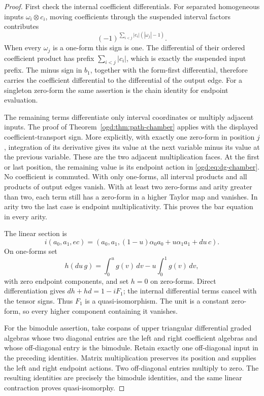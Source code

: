 \begin{proof}
First check the internal coefficient differentials. For separated
homogeneous inputs \(\omega_i\otimes c_i\), moving coefficients
through the suspended interval factors contributes
\[
 (-1)^{\sum_{i<j}|c_i|(|\omega_j|-1)}.
\]
When every \(\omega_j\) is a one-form this sign is one.
The differential of their ordered coefficient product has prefix
\(\sum_{i<j}|c_i|\), which is exactly the suspended input prefix.
The minus sign in \(b_1\), together with the form-first differential,
therefore carries the coefficient differential to the differential of
the output edge. For a singleton zero-form the same assertion is the
chain identity for endpoint evaluation.

The remaining terms differentiate only interval coordinates or multiply
adjacent inputs. The proof of Theorem~\ref{ogd:thm:path-chamber}
applies with the displayed coefficient-transport sign. More explicitly,
with exactly one zero-form in position \(j\), integration of its
derivative gives its value at the next variable minus its value at the
previous variable. These are the two adjacent multiplication faces.
At the first or last position, the remaining value is its endpoint
action in \eqref{ogd:eq:dg-chamber}. No coefficient is commuted.
With only one-forms, all interval products and all products of output
edges vanish. With at least two zero-forms and arity greater than two,
each term still has a zero-form in a higher Taylor map and vanishes.
In arity two the last case is endpoint multiplicativity. This proves
the bar equation in every arity.

The linear section is
\[
 i(a_0,a_1,ec)=
 (a_0,a_1,(1-u)\alpha_0a_0+u\alpha_1a_1+du\,c).
\]
On one-forms set
\[
 h(du\,g)=\int_0^u g(v)\,dv-u\int_0^1g(v)\,dv,
\]
with zero endpoint components, and set \(h=0\) on zero-forms.
Direct differentiation gives \(dh+hd=1-iF_1\); the internal
differential terms cancel with the tensor signs. Thus \(F_1\)
is a quasi-isomorphism. The unit is a constant zero-form, so every
higher component containing it vanishes.

For the bimodule assertion, take cospans of upper triangular differential
graded algebras whose two diagonal entries are the left and right
coefficient algebras and whose off-diagonal entry is the bimodule.
Retain exactly one off-diagonal input in the preceding identities.
Matrix multiplication preserves its position and supplies the left
and right endpoint actions. Two off-diagonal entries multiply to zero.
The resulting identities are precisely the bimodule identities, and
the same linear contraction proves quasi-isomorphy.
\end{proof}

